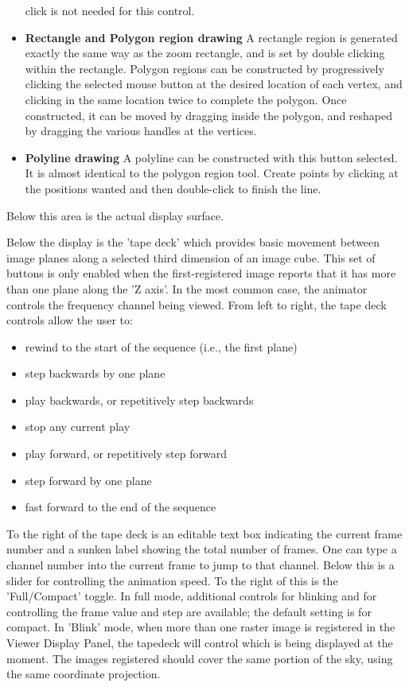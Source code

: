 \begin{itemize}
     click is not needed for this control.
   \item {\bf Rectangle and Polygon region drawing}
     A rectangle region is generated exactly the same way as the zoom
     rectangle, and is set by double clicking within the
     rectangle. Polygon regions can be constructed by progressively
     clicking the selected mouse button at the desired location of
     each vertex, and clicking in the same location twice to complete
     the polygon. Once constructed, it can be moved by dragging inside
     the polygon, and reshaped by dragging the various handles at the
     vertices. 
   \item {\bf Polyline drawing}
     A polyline can be constructed with this button selected. It is
     almost identical to the polygon region tool. Create points by
     clicking at the positions wanted and then double-click to finish
     the line.  
\end{itemize}

Below this area is the actual display surface.

Below the display is the 'tape deck' which provides basic movement
between image planes along a selected third dimension of an image
cube. This set of buttons is only enabled when the first-registered
image reports that it has more than one plane along the 'Z axis'. In
the most common case, the animator controls the frequency channel
being viewed. From left to right, the tape deck controls allow the
user to:

\begin{itemize}
   \item rewind to the start of the sequence (i.e., the first plane)
   \item step backwards by one plane
   \item play backwards, or repetitively step backwards
   \item stop any current play
   \item play forward, or repetitively step forward
   \item step forward by one plane
   \item fast forward to the end of the sequence
\end{itemize}

To the right of the tape deck is an editable text box indicating the
current frame number and a sunken label showing the total number of
frames. One can type a channel number into the current frame to jump
to that channel. Below this is a slider for controlling the animation
speed. To the right of this is the 'Full/Compact' toggle. In full
mode, additional controls for blinking and for controlling the frame
value and step are available; the default setting is for compact. In
'Blink' mode, when more than one raster image is registered in the
Viewer Display Panel, the tapedeck will control which is being
displayed at the moment. The images registered should cover the same
portion of the sky, using the same coordinate projection.

